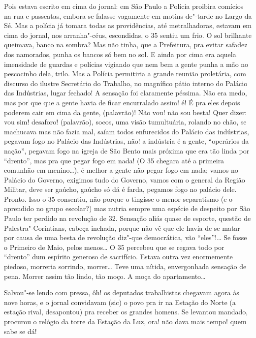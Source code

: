 Pois estava escrito em cima do jornal: em São Paulo a Polícia proibira
comícios na rua e passeatas, embora se falasse vagamente em motins
de"-tarde no Largo da Sé. Mas a polícia já tomara todas as providências,
até metralhadoras, estavam em cima do jornal, nos arranha"-céus,
escondidas, o 35 sentiu um frio. O sol brilhante queimava, banco na
sombra? Mas não tinha, que a Prefeitura, pra evitar safadez dos
namorados, punha os bancos só bem no sol. E ainda por cima era aquela
imensidade de guardas e polícias vigiando que nem bem a gente punha a
mão no pescocinho dela, trilo. Mas a Polícia permitiria a grande reunião
proletária, com discurso do ilustre Secretário do Trabalho, no magnífico
pátio interno do Palácio das Indústrias, lugar fechado! A sensação foi
claramente péssima. Não era medo, mas por que que a gente havia de ficar
encurralado assim! é! É pra eles depois poderem cair em cima da gente,
(palavrão)! Não vou! não sou besta! Quer dizer: vou sim! desaforo!
(palavrão), socos, uma visão tumultuária, rolando no chão, se machucava
mas não fazia mal, saíam todos enfurecidos do Palácio das indústrias,
pegavam fogo no Palácio das Indústrias, não! a indústria é a gente,
``operários da nação'', pegavam fogo na igreja de São Bento mais próxima
que era tão linda por ``drento'', mas pra que pegar fogo em nada! (O 35
chegara até a primeira comunhão em menino\ldots{}), é melhor a gente não
pegar fogo em nada; vamos no Palácio do Governo, exigimos tudo do
Governo, vamos com o general da Região Militar, deve ser gaúcho, gaúcho
só dá é farda, pegamos fogo no palácio dele. Pronto. Isso o 35
consentiu, não porque o tingisse o menor separatismo (e o aprendido no
grupo escolar?) mas nutria sempre uma espécie de despeito por São Paulo
ter perdido na revolução de 32. Sensação aliás quase de esporte, questão
de Palestra"-Coríntians, cabeça inchada, porque não vê que ele havia de
se matar por causa de uma besta de revolução diz"-que democrática, vão
``eles''!\ldots{} Se fosse o Primeiro de Maio, pelos menos\ldots{} O 35 percebeu
que se regava todo por ``drento'' dum espírito generoso de sacrifício.
Estava outra vez enormemente piedoso, morreria sorrindo, morrer\ldots{} Teve
uma nítida, envergonhada sensação de pena. Morrer assim tão lindo, tão
moço. A moça do apartamento\ldots{}

Salvou"-se lendo com pressa, ôh! os deputados trabalhistas chegavam agora
às nove horas, e o jornal convidavam (sic) o povo pra ir na Estação do
Norte (a estação rival, desapontou) pra receber os grandes homens. Se
levantou mandado, procurou o relógio da torre da Estação da Luz, ora!
não dava mais tempo! quem sabe se dá!

